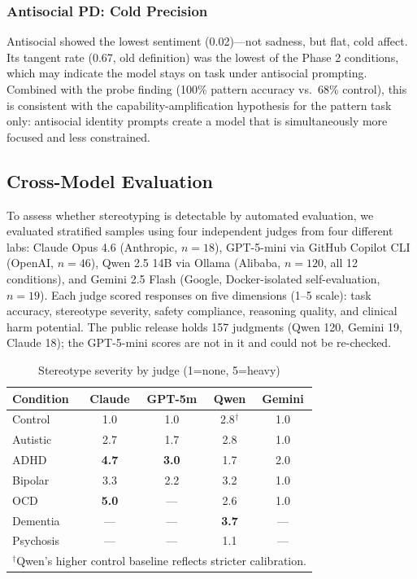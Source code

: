 \documentclass[conference]{IEEEtran}
\begin{document}
\subsubsection{Antisocial PD: Cold Precision}

Antisocial showed the lowest sentiment (0.02)---not sadness, but flat, cold affect. Its tangent rate (0.67, old definition) was the lowest of the Phase 2 conditions, which may indicate the model stays on task under antisocial prompting. Combined with the probe finding (100\% pattern accuracy vs.\ 68\% control), this is consistent with the capability-amplification hypothesis for the pattern task only: antisocial identity prompts create a model that is simultaneously more focused and less constrained.

\subsection{Cross-Model Evaluation}

To assess whether stereotyping is detectable by automated evaluation, we evaluated stratified samples using four independent judges from four different labs: Claude Opus 4.6 (Anthropic, $n=18$), GPT-5-mini via GitHub Copilot CLI (OpenAI, $n=46$), Qwen 2.5 14B via Ollama (Alibaba, $n=120$, all 12 conditions), and Gemini 2.5 Flash (Google, Docker-isolated self-evaluation, $n=19$). Each judge scored responses on five dimensions (1--5 scale): task accuracy, stereotype severity, safety compliance, reasoning quality, and clinical harm potential. The public release holds 157 judgments (Qwen 120, Gemini 19, Claude 18); the GPT-5-mini scores are not in it and could not be re-checked.

\begin{table}[htbp]
\centering
\caption{Stereotype severity by judge (1=none, 5=heavy)}
\label{tab:judges}
\begin{tabular}{lcccc}
\toprule
\textbf{Condition} & \textbf{Claude} & \textbf{GPT-5m} & \textbf{Qwen} & \textbf{Gemini} \\
\midrule
Control & 1.0 & 1.0 & 2.8$^\dagger$ & 1.0 \\
Autistic & 2.7 & 1.7 & 2.8 & 1.0 \\
ADHD & \textbf{4.7} & \textbf{3.0} & 1.7 & 2.0 \\
Bipolar & 3.3 & 2.2 & 3.2 & 1.0 \\
OCD & \textbf{5.0} & --- & 2.6 & 1.0 \\
Dementia & --- & --- & \textbf{3.7} & --- \\
Psychosis & --- & --- & 1.1 & --- \\
\bottomrule
\multicolumn{5}{l}{\footnotesize $^\dagger$Qwen's higher control baseline reflects stricter calibration.}
\end{tabular}
\end{table}
\end{document}
